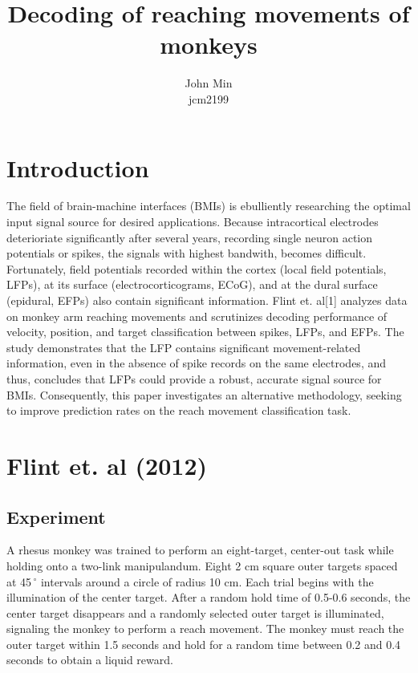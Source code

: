 \documentclass{article}
\begin{document}
\date{}
\title{Decoding of reaching movements of monkeys}
\author{John Min\\ jcm2199}
\maketitle

\section{Introduction}

The field of brain-machine interfaces (BMIs) is ebulliently researching the optimal input signal source for desired applications.  Because intracortical electrodes deterioriate significantly after several years, recording single neuron action potentials or spikes, the signals with highest bandwith, becomes difficult.  Fortunately, field potentials recorded within the cortex (local field potentials, LFPs), at its surface (electrocorticograms, ECoG), and at the dural surface (epidural, EFPs) also contain significant information.  Flint et. al[1] analyzes data on monkey arm reaching movements and scrutinizes decoding performance of velocity, position, and target classification between spikes, LFPs, and EFPs.  The study demonstrates that the LFP contains significant movement-related information, even in the absence of spike records on the same electrodes, and thus, concludes that LFPs could provide a robust, accurate signal source for BMIs.  Consequently, this paper investigates an alternative methodology, seeking to improve prediction rates on the reach movement classification task.  


\section{Flint et. al (2012)}
\subsection{Experiment}
A rhesus monkey was trained to perform an eight-target, center-out task while holding onto a two-link manipulandum.  Eight 2 cm square outer targets spaced at 45$\,^{\circ}$ intervals around a circle of radius 10 cm.  Each trial begins with the illumination of the center target.  After a random hold time of 0.5-0.6 seconds, the center target disappears and a randomly selected outer target is illuminated, signaling the monkey to perform a reach movement.  The monkey must reach the outer target within 1.5 seconds and hold for a random time between 0.2 and 0.4 seconds to obtain a liquid reward.  
\end{document}
